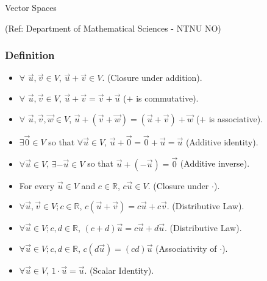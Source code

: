 \begin{frame}[fragile]\frametitle{}
\begin{center}
{\Large Vector Spaces}

\tiny{(Ref: Department of Mathematical Sciences - NTNU NO)}

\end{center}
\end{frame}

 \begin{frame}[fragile]\frametitle{Definition}
 
\begin{itemize}
\item $\forall$  $\vec{u}, \vec{v} \in V$, $\vec{u} + \vec{v}\in V$.
(Closure under addition).
\item  $\forall$  $\vec{u}, \vec{v} \in V$, 
$\vec{u} + \vec{v} =\vec{v} + \vec{u}$  ($+$ is commutative).
\item $\forall$  $\vec{u}, \vec{v},\vec{w} \in V$, 
$\vec{u} + (\vec{v} + \vec{w}) =   
(\vec{u} + \vec{v}) + \vec{w}$  ($+$ is associative).
\item $\exists \vec{0} \in V$ so that $\forall \vec{u} \in V$, 
$\vec{u}+ \vec{0} = \vec{0}+ \vec{u} = \vec{u} $  
(Additive identity).
\item $\forall \vec{u} \in V$, $\exists -\vec{u}\in V$ so that 
$\vec{u} + (-\vec{u}) = \vec{0}$ (Additive inverse).
\item For every $\vec{u}\in V$ and $c \in \mathbb R$, $c\vec{u} \in V$. (Closure under $\cdot$).
\item $\forall \vec{u}, \vec{v} \in V; c \in \mathbb R$, 
$c(\vec{u}+\vec{v}) = c \vec{u} + c\vec{v}$.  (Distributive Law).
\item $\forall \vec{u} \in V; c,d \in \mathbb R$, 
$(c+d) \vec{u} = c\vec{u} + d \vec{u}$.  (Distributive Law).
\item $\forall  \vec{u} \in V; c,d \in \mathbb R$,
$c(d\vec{u}) = (cd)\vec{u}$ (Associativity of $\cdot$).
\item $\forall \vec{u} \in V$,  $1\cdot\vec{u} = \vec{u}$.  (Scalar Identity).
\end{itemize}

\end{frame}









